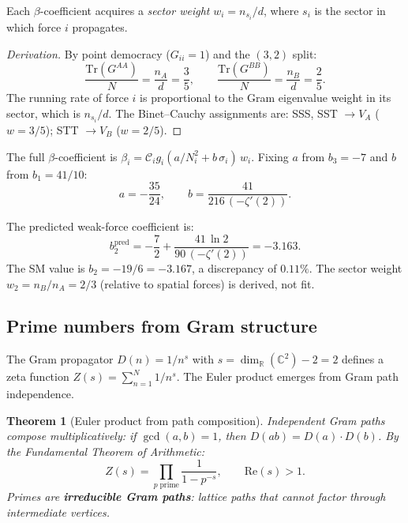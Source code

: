 \documentclass[12pt]{article}
\newtheorem{theorem}{Theorem}[section]
\theoremstyle{remark}
\theoremstyle{definition}
\newcommand{\CC}{\mathbb{C}}
\newcommand{\RR}{\mathbb{R}}
\begin{document}
Each $\beta$-coefficient acquires a \emph{sector weight} $w_i = n_{s_i}/d$, where $s_i$ is the sector in which force $i$ propagates.

\begin{proof}[Derivation]
By point democracy ($G_{ii} = 1$) and the $(3,2)$ split:
\begin{equation}
\frac{\mathrm{Tr}(G^{AA})}{N} = \frac{n_A}{d} = \frac{3}{5}, \qquad \frac{\mathrm{Tr}(G^{BB})}{N} = \frac{n_B}{d} = \frac{2}{5}.
\end{equation}
The running rate of force $i$ is proportional to the Gram eigenvalue weight in its sector, which is $n_{s_i}/d$.  The Binet--Cauchy assignments are: SSS, SST $\to V_A$ ($w = 3/5$); STT $\to V_B$ ($w = 2/5$).
\end{proof}

The full $\beta$-coefficient is $\beta_i = \mathcal{C}_i g_i (a/N_i^2 + b\,\sigma_i)\,w_i$.  Fixing $a$ from $b_3 = -7$ and $b$ from $b_1 = 41/10$:
\begin{equation}
a = -\frac{35}{24}, \qquad b = \frac{41}{216\,(-\zeta'(2))}.
\end{equation}

The predicted weak-force coefficient is:
\begin{equation}
\boxed{b_2^{\mathrm{pred}} = -\frac{7}{2} + \frac{41\,\ln 2}{90\,(-\zeta'(2))} = -3.163.}
\end{equation}
The SM value is $b_2 = -19/6 = -3.167$, a discrepancy of $0.11\%$.  The sector weight $w_2 = n_B/n_A = 2/3$ (relative to spatial forces) is derived, not fit.

\subsection{Prime numbers from Gram structure}
\label{sec:primes}

The Gram propagator $D(n) = 1/n^s$ with $s = \dim_\RR(\CC^2) - 2 = 2$ defines a zeta function $Z(s) = \sum_{n=1}^N 1/n^s$.  The Euler product emerges from Gram path independence.

\begin{theorem}[Euler product from path composition]
\label{thm:euler_product}
Independent Gram paths compose multiplicatively: if $\gcd(a,b)=1$, then $D(ab)=D(a)\cdot D(b)$.  By the Fundamental Theorem of Arithmetic:
\begin{equation}
Z(s) = \prod_{p\;\mathrm{prime}} \frac{1}{1-p^{-s}}, \qquad \mathrm{Re}(s)>1.
\end{equation}
Primes are \textbf{irreducible Gram paths}: lattice paths that cannot factor through intermediate vertices.
\end{theorem}
\end{document}
